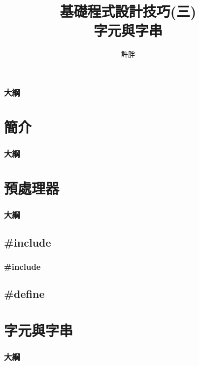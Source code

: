 \documentclass[utf8]{beamer}
\begin{document}
\begin{CJK}{UTF8}{bkai}

\title{基礎程式設計技巧(三)\\字元與字串}
\author{許胖}

\begin{frame}
  \titlepage
\end{frame}
\begin{frame}
  \frametitle{大綱}
  \begin{multicols}{2}
    \tableofcontents
  \end{multicols}
\end{frame}

\section{簡介}
\begin{frame}
  \frametitle{大綱}
  \begin{multicols}{2}
    \tableofcontents[currentsection]
  \end{multicols}
\end{frame}

\section{預處理器}
\begin{frame}
  \frametitle{大綱}
  \begin{multicols}{2}
    \tableofcontents[currentsection]
  \end{multicols}
\end{frame}

\subsection{\#include}

\begin{frame}
  \frametitle{\#include}
\end{frame}

\subsection{\#define}

\section{字元與字串}
\begin{frame}
  \frametitle{大綱}
  \begin{multicols}{2}
    \tableofcontents[currentsection]
  \end{multicols}
\end{frame}


\end{CJK}
\end{document}
